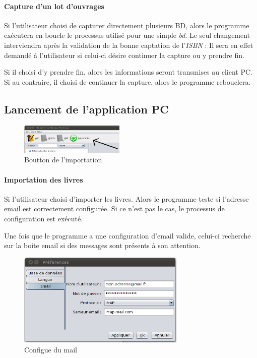 \paragraph{Capture d'un lot d'ouvrages}
Si l'utilisateur choisi de capturer directement plusieurs BD, alors le programme exécutera en boucle le processus utilisé pour une simple \emph{bd}. 
Le seul changement interviendra après la validation de la bonne captation de l'\emph{ISBN} :
Il sera en effet demandé à l'utilisateur si celui-ci désire continuer la capture ou y prendre fin. 

Si il choisi d'y prendre fin, alors les informations seront transmises au client PC. 
Si au contraire, il choisi de continuer la capture, alors le programme rebouclera. 



\subsection{Lancement de l'application PC}


\begin{figure}
\includegraphics[width=5cm]{../img/btn_synchro.png}
\caption{Boutton de l'importation}
\end{figure}
\paragraph{Importation des livres}
Si l'utilisateur choisi d'importer les livres. Alors le programme teste si l'adresse email est correctement configurée. Si ce n'est pas le cas, le processus de configuration est exécuté. 

Une fois que le programme a une configuration d'email valide, celui-ci recherche sur la boite email si des messages sont présents à son attention. 

\begin{figure}
\includegraphics[width=8cm]{../img/preferenceMail.png}
\caption{Configue du mail}
\end{figure}
